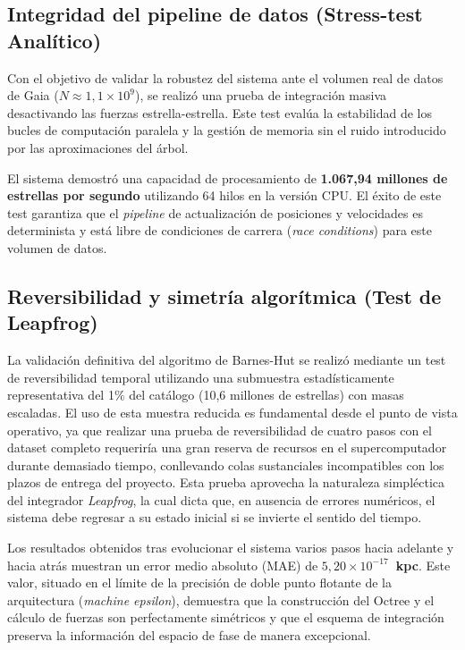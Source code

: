\subsection{Integridad del pipeline de datos (Stress-test Analítico)}

Con el objetivo de validar la robustez del sistema ante el volumen real de datos de Gaia ($N \approx 1,1 \times 10^9$), se realizó una prueba de integración masiva desactivando las fuerzas estrella-estrella.
Este test evalúa la estabilidad de los bucles de computación paralela y la gestión de memoria sin el ruido introducido por las aproximaciones del árbol.

El sistema demostró una capacidad de procesamiento de \textbf{1.067,94 millones de estrellas por segundo} utilizando 64 hilos en la versión CPU.
El éxito de este test garantiza que el \textit{pipeline} de actualización de posiciones y velocidades es determinista y está libre de condiciones de carrera (\textit{race conditions}) para este volumen de datos.

\subsection{Reversibilidad y simetría algorítmica (Test de Leapfrog)}

La validación definitiva del algoritmo de Barnes-Hut se realizó mediante un test de reversibilidad temporal utilizando una submuestra estadísticamente representativa del 1\% del catálogo (10,6 millones de estrellas) con masas escaladas.
El uso de esta muestra reducida es fundamental desde el punto de vista operativo, ya que realizar una prueba de reversibilidad de cuatro pasos con el dataset completo requeriría una gran reserva de recursos en el supercomputador durante demasiado tiempo, conllevando colas sustanciales incompatibles con los plazos de entrega del proyecto.
Esta prueba aprovecha la naturaleza simpléctica del integrador \textit{Leapfrog}, la cual dicta que, en ausencia de errores numéricos, el sistema debe regresar a su estado inicial si se invierte el sentido del tiempo.

Los resultados obtenidos tras evolucionar el sistema varios pasos hacia adelante y hacia atrás muestran un error medio absoluto (MAE) de \textbf{$5,20 \times 10^{-17}$~kpc}.
Este valor, situado en el límite de la precisión de doble punto flotante de la arquitectura (\textit{machine epsilon}), demuestra que la construcción del Octree y el cálculo de fuerzas son perfectamente simétricos y que el esquema de integración preserva la información del espacio de fase de manera excepcional.

